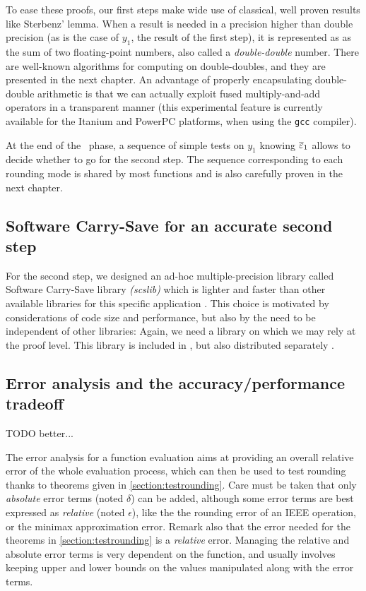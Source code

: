 To ease these proofs, our first steps make wide use of classical, well
proven results like Sterbenz' lemma. When a result is needed in a
precision higher than double precision (as is the case of $y_1$,
the result of the first step), it is represented as as the sum of two
floating-point numbers, also called a \emph{double-double} number.
There are well-known algorithms for computing on double-doubles, and
they are presented in the next chapter. An advantage of properly
encapsulating double-double arithmetic is that we can actually exploit
fused multiply-and-add operators in a transparent manner (this
experimental feature is currently available for the Itanium and
PowerPC platforms, when using the \texttt{gcc} compiler).

At the end of the \quick\ phase, a sequence of simple tests on
$y_1$ knowing ${\overline{\varepsilon}}_1$ allows to decide whether to go for
the second step. The sequence corresponding to each rounding mode is
shared by most functions and is also carefully proven in the next
chapter.


\subsection{Software Carry-Save for an accurate second step}
For the second step, we designed an ad-hoc multiple-precision library
called Software Carry-Save library \emph{(scslib)} which is lighter
and faster than other available libraries for this specific
application \cite{DefDin2002,DinDef2003}. This choice is motivated by
considerations of code size and performance, but also by the need to
be independent of other libraries: Again, we need a library on which
we may rely at the proof level. This library is included in \crlibm,
but also distributed separately \cite{SCSweb}.


\subsection{Error analysis and the accuracy/performance tradeoff\label{sec:error-accuracy-perf}}

TODO better...

The error analysis for a function evaluation aims at providing an
overall relative error of the whole evaluation process, which can then
be used to test rounding thanks to theorems given in
\ref{section:testrounding}. Care must be taken that only
\emph{absolute} error terms (noted $\delta$) can be added, although
some error terms are best expressed as \emph{relative} (noted
$\epsilon$), like the the rounding error of an IEEE operation, or the
minimax approximation error. Remark also that the error needed for the
theorems in \ref{section:testrounding} is a \emph{relative} error.
Managing the relative and absolute error terms is very dependent on
the function, and usually involves keeping upper and lower bounds on
the values manipulated along with the error terms. 

